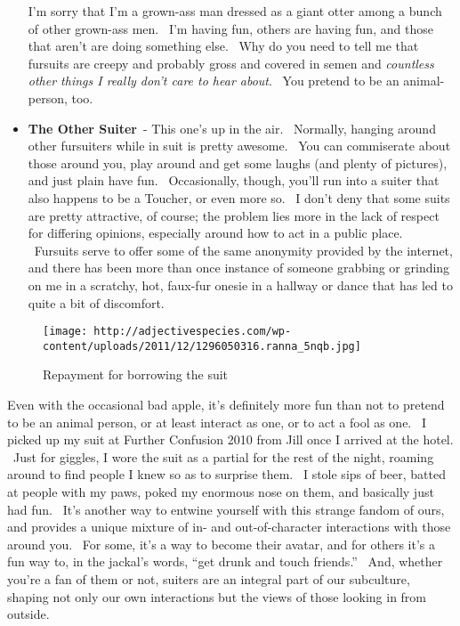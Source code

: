 \begin{itemize}
  I'm sorry that I'm a grown-ass man dressed as a giant otter among a
  bunch of other grown-ass men. ~I'm having fun, others are having fun,
  and those that aren't are doing something else. ~Why do you need to
  tell me that fursuits are creepy and probably gross and covered in
  semen and \emph{countless other things I really don't care to hear
  about}. ~You pretend to be an animal-person, too.
\item
  \textbf{The Other Suiter}~- This one's up in the air. ~Normally,
  hanging around other fursuiters while in suit is pretty awesome. ~You
  can commiserate about those around you, play around and get some
  laughs (and plenty of pictures), and just plain have fun.
  ~Occasionally, though, you'll run into a suiter that also happens to
  be a Toucher, or even more so. ~I don't deny that some suits are
  pretty attractive, of course; the problem lies more in the lack of
  respect for differing opinions, especially around how to act in a
  public place. ~Fursuits serve to offer some of the same anonymity
  provided by the internet, and there has been more than once instance
  of someone grabbing or grinding on me in a scratchy, hot, faux-fur
  onesie in a hallway or dance that has led to quite a bit of
  discomfort.
\end{itemize}

\begin{figure}[htbp]
\centering
\texttt{[image: http://adjectivespecies.com/wp-content/uploads/2011/12/1296050316.ranna\_5nqb.jpg]}
\caption{Repayment for borrowing the suit}
\end{figure}

Even with the occasional bad apple, it's definitely more fun than not to
pretend to be an animal person, or at least interact as one, or to act a
fool as one. ~I picked up my suit at Further Confusion 2010 from Jill
once I arrived at the hotel. ~Just for giggles, I wore the suit as a
partial for the rest of the night, roaming around to find people I knew
so as to surprise them. ~I stole sips of beer, batted at people with my
paws, poked my enormous nose on them, and basically just had fun. ~It's
another way to entwine yourself with this strange fandom of ours, and
provides a unique mixture of in- and out-of-character interactions with
those around you. ~For some, it's a way to become their avatar, and for
others it's a fun way to, in the jackal's words, ``get drunk and touch
friends.'' ~And, whether you're a fan of them or not, suiters are an
integral part of our subculture, shaping not only our own interactions
but the views of those looking in from outside.

